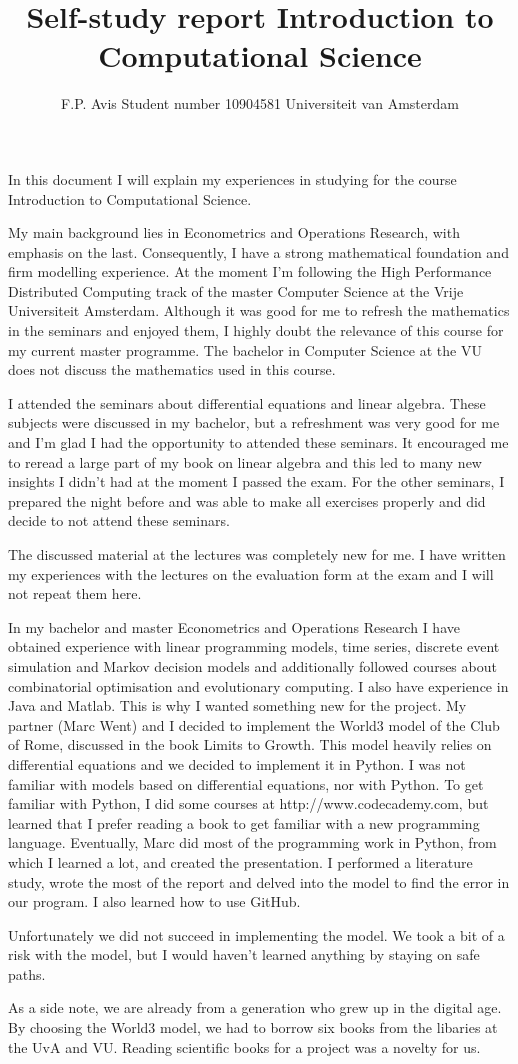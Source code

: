 \documentclass[10pt,a4paper]{article}
\author{F.P. Avis \quad Student number 10904581 \quad Universiteit van Amsterdam}
\title{Self-study report Introduction to Computational Science}
\begin{document}
\maketitle

In this document I will explain my experiences in studying for the course Introduction to Computational Science.

My main background lies in Econometrics and Operations Research, with emphasis on the last. Consequently, I have a strong mathematical foundation and firm modelling experience. At the moment I'm following the High Performance Distributed Computing track of the master Computer Science at the Vrije Universiteit Amsterdam. Although it was good for me to refresh the mathematics in the seminars and enjoyed them, I highly doubt the relevance of this course for my current master programme. The bachelor in Computer Science at the VU does not discuss the mathematics used in this course.

I attended the seminars about differential equations and linear algebra. These subjects were discussed in my bachelor, but a refreshment was very good for me and I'm glad I had the opportunity to attended these seminars. It encouraged me to reread a large part of my book on linear algebra and this led to many new insights I didn't had at the moment I passed the exam. For the other seminars, I prepared the night before and was able to make all exercises properly and did decide to not attend these seminars.

The discussed material at the lectures was completely new for me. I have written my experiences with the lectures on the evaluation form at the exam and I will not repeat them here.

In my bachelor and master Econometrics and Operations Research I have obtained experience with linear programming models, time series, discrete event simulation and Markov decision models and additionally followed courses about combinatorial optimisation and evolutionary computing. I also have experience in Java and Matlab. This is why I wanted something new for the project. My partner (Marc Went) and I decided to implement the World3 model of the Club of Rome, discussed in the book Limits to Growth. This model heavily relies on differential equations and we decided to implement it in Python. I was not familiar with models based on differential equations, nor with Python. To get familiar with Python, I did some courses at http://www.codecademy.com, but learned that I prefer reading a book to get familiar with a new programming language. Eventually, Marc did most of the programming work in Python, from which I learned a lot, and created the presentation. I performed a literature study, wrote the most of the report and delved into the model to find the error in our program. I also learned how to use GitHub.

Unfortunately we did not succeed in implementing the model. We took a bit of a risk with the model, but I would haven't learned anything by staying on safe paths.

As a side note, we are already from a generation who grew up in the digital age. By choosing the World3 model, we had to borrow six books from the libaries at the UvA and VU. Reading scientific books for a project was a novelty for us.
\end{document}
